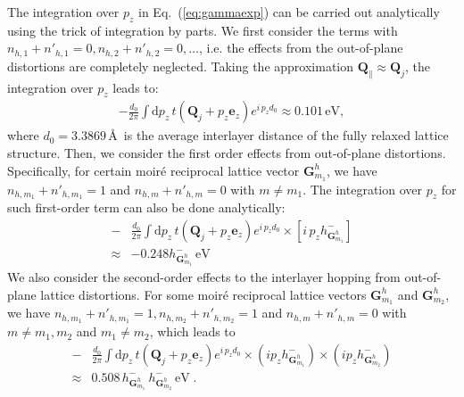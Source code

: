 \documentclass[aps,prx,10pt,twocolumn,superscriptaddress]{revtex4}
\def\angstrom{\mbox{\normalfont\AA}}
\def\angstrom{\mbox{\normalfont\AA}}
\begin{document}
The integration over $p_z$ in Eq.~(\ref{eq:gammaexp}) can be carried out analytically using the trick of integration by parts. We first consider the terms with $n_{h,1}+n'_{h,1}=0, n_{h,2}+n'_{h,2}=0, \dots$, i.e. the effects from the out-of-plane distortions are completely neglected. Taking the approximation $\mathbf{Q}_{\parallel}\approx\mathbf{Q}_j$,  the integration over $p_z$ leads to:
\begin{equation}
\begin{split}
-\frac{d_{0}}{2\pi}\int\mathrm{d}p_{z}\,t(\textbf{Q}_j+p_{z}\textbf{e}_{z})e^{i\,p_{z}d_{0}}
\approx 0.101\,\textrm{eV},
\end{split}
\label{eq:t0}
\end{equation}
where $d_0=3.3869\,$\angstrom\ is the average interlayer distance of the fully relaxed lattice structure.
Then, we consider the first order effects from out-of-plane distortions.  Specifically, for certain moir\'e reciprocal lattice vector $\textbf{G}^{h}_{m_{1}}$, we have $n_{h,m_{1}}+n'_{h,m_{1}}\!=\!1$ and $n_{h,m}+n'_{h,m}\!=\!0$ with $m\!\neq\!m_{1}$. The integration over $p_z$ for such first-order term can also be done analytically:
\begin{equation}
\begin{split}
-&\frac{d_{0}}{2\pi}\int\mathrm{d}p_{z}\,t(\textbf{Q}_j+p_{z}\textbf{e}_{z})e^{i\,p_{z}d_{0}}\times\left[i\,p_{z}h^{-}_{\textbf{G}_{m_{1}}^{h}}\right]\\
\approx & -0.248h^{-}_{\textbf{G}_{m_{1}}^{h}}\,\textrm{eV}
\end{split}
\label{eq:t1}
\end{equation}
We also consider the second-order effects to the interlayer hopping from out-of-plane lattice distortions. For some moir\'e reciprocal lattice vectors $\textbf{G}^{h}_{m_{1}}$ and $\textbf{G}^{h}_{m_{2}}$, we have $n_{h,m_{1}}+n'_{h,m_{1}}=1, n_{h,m_{2}}+n'_{h,m_{2}}\!=\!1$ and $n_{h,m}+n'_{h,m}\!=\!0$ with $m\!\neq\!m_{1}, m_{2}$ and $m_{1}\!\neq\!m_{2}$, which leads to
\begin{equation}
\begin{split}
-&\frac{d_{0}}{2\pi}\int\mathrm{d}p_{z}\,t(\textbf{Q}_j+p_{z}\textbf{e}_{z})e^{i\,p_{z}d_{0}}\times (ip_z h^{-}_{\mathbf{G}^{h}_{m_{1}}})\times(ip_z h^{-}_{\mathbf{G}^{h}_{m_{2}}})\\
\approx &0.508 \,h^{-}_{\mathbf{G}^{h}_{m_{1}}}\,h^{-}_{\mathbf{G}^{h}_{m_{2}}}\,\textrm{eV}\;.
\end{split}
\label{eq:t2}
\end{equation}
\end{document}
